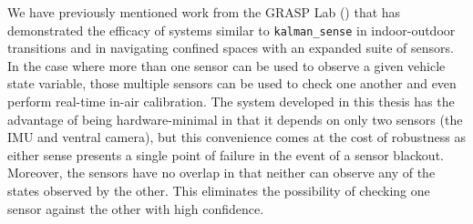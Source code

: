 We have previously mentioned work from the GRASP Lab (\cite{Shen2011}) that has demonstrated the efficacy of systems similar to \texttt{kalman\_sense} in indoor-outdoor transitions and in navigating confined spaces with an expanded suite of sensors. In the case where more than one sensor can be used to observe a given vehicle state variable, those multiple sensors can be used to check one another and even perform real-time in-air calibration. The system developed in this thesis has the advantage of being hardware-minimal in that it depends on only two sensors (the IMU and ventral camera), but this convenience comes at the cost of robustness as either sense presents a single point of failure in the event of a sensor blackout. Moreover, the sensors have no overlap in that neither can observe any of the states observed by the other. This eliminates the possibility of checking one sensor against the other with high confidence.




